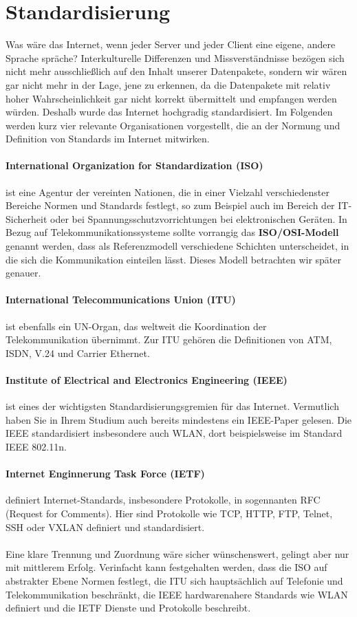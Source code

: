 \documentclass[11pt,a4paper]{scrartcl}
\begin{document}
\section{Standardisierung}
Was wäre das Internet, wenn jeder Server und jeder Client eine eigene, andere Sprache spräche? Interkulturelle Differenzen und Missverständnisse bezögen sich nicht mehr ausschließlich auf den Inhalt unserer Datenpakete, sondern wir wären gar nicht mehr in der Lage, jene zu erkennen, da die Datenpakete mit relativ hoher Wahrscheinlichkeit gar nicht korrekt übermittelt und empfangen werden würden. Deshalb wurde das Internet hochgradig standardisiert. Im Folgenden werden kurz vier relevante Organisationen vorgestellt, die an der Normung und Definition von Standards im Internet mitwirken.
\paragraph{International Organization for Standardization (ISO)} ist eine Agentur der vereinten Nationen, die in einer Vielzahl verschiedenster Bereiche Normen und Standards festlegt, so zum Beispiel auch im Bereich der IT-Sicherheit oder bei Spannungsschutzvorrichtungen bei elektronischen Geräten. In Bezug auf Telekommunikationssysteme sollte vorrangig das \textbf{ISO/OSI-Modell} genannt werden, dass als Referenzmodell verschiedene Schichten unterscheidet, in die sich die Kommunikation einteilen lässt. Dieses Modell betrachten wir später genauer.
\paragraph{International Telecommunications Union (ITU)} ist ebenfalls ein UN-Organ, das weltweit die Koordination der Telekommunikation übernimmt. Zur ITU gehören die Definitionen von ATM, ISDN, V.24 und Carrier Ethernet.
\paragraph{Institute of Electrical and Electronics Engineering (IEEE)} ist eines der wichtigsten Standardisierungsgremien für das Internet. Vermutlich haben Sie in Ihrem Studium auch bereits mindestens ein IEEE-Paper gelesen. Die IEEE standardisiert insbesondere auch WLAN, dort beispielsweise im Standard IEEE 802.11n.
\paragraph{Internet Enginnerung Task Force (IETF)} definiert Internet-Standards, insbesondere Protokolle, in sogennanten RFC (Request for Comments). Hier sind Protokolle wie TCP, HTTP, FTP, Telnet, SSH oder VXLAN definiert und standardisiert. \\\\
Eine klare Trennung und Zuordnung wäre sicher wünschenswert, gelingt aber nur mit mittlerem Erfolg. Verinfacht kann festgehalten werden, dass die ISO auf abstrakter Ebene Normen festlegt, die ITU sich hauptsächlich auf Telefonie und Telekommunikation beschränkt, die IEEE hardwarenahere Standards wie WLAN definiert und die IETF Dienste und Protokolle beschreibt. 
\end{document}
